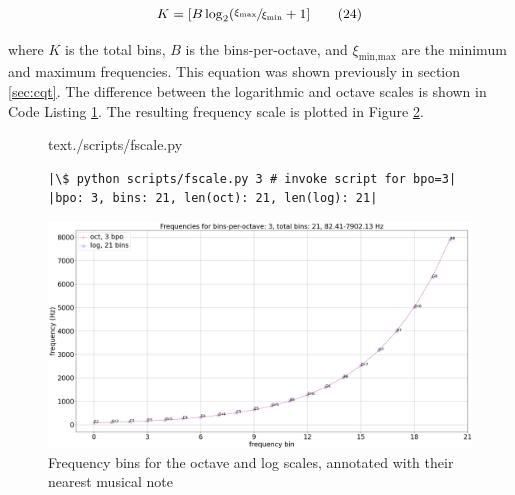 \documentclass[report.tex]{subfiles}
\begin{document}
\begin{align}
	K = [B \log_{2}(\sfrac{\xi_{\text{max}}}{\xi_{\text{min}}} + 1]\tag{24}\label{equation:bpo1}
\end{align}

where $K$ is the total bins, $B$ is the bins-per-octave, and $\xi_{\text{min,max}}$ are the minimum and maximum frequencies. This equation was shown previously in section \ref{sec:cqt}. The difference between the logarithmic and octave scales is shown in Code Listing \ref{code:octvlog}. The resulting frequency scale is plotted in Figure \ref{fig:octvlog}.

\begin{figure}[h]
  \centering
 \begin{minipage}{\textwidth}
  \centering
\setlength\partopsep{-\topsep}
\begin{inputminted}[linenos,breaklines,frame=single,firstline=4,lastline=16,fontsize=\scriptsize]{text}{./scripts/fscale.py}
\end{inputminted}
 \vspace{1em}
 \end{minipage}
 \begin{minipage}{\textwidth}
  \centering
\begin{verbatim}
|\$ python scripts/fscale.py 3 # invoke script for bpo=3|
|bpo: 3, bins: 21, len(oct): 21, len(log): 21|
\end{verbatim}
 \end{minipage}
  \label{code:octvlog}
\end{figure}

\begin{figure}[ht]
	\centering
	\includegraphics[width=\textwidth]{./images-freqscales/log_vs_oct.png}
	\caption{Frequency bins for the octave and log scales, annotated with their nearest musical note}
	\label{fig:octvlog}
\end{figure}
\end{document}
